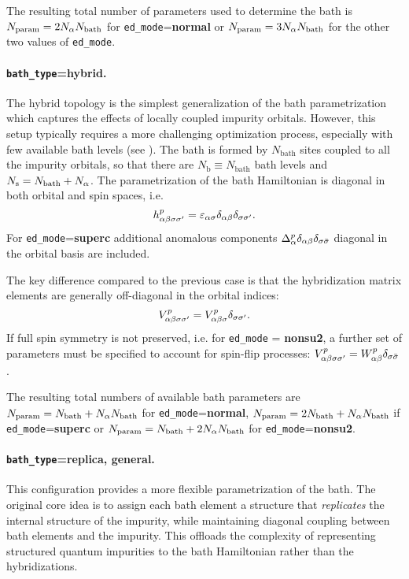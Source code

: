 \documentclass[edipack_sp.tex]{subfiles}
\begin{document}
The resulting total number of parameters used to determine the bath is $N_\mathrm{param}=2N_\alpha N_\mathrm{bath}$ for {\tt ed\_mode}={\bf normal} or $N_\mathrm{param}=3N_\alpha N_\mathrm{bath}$ for the other two values of {\tt ed\_mode}.


\paragraph{{\tt bath\_type}={\bf hybrid}.}
The hybrid topology is the simplest generalization of the bath pa\-ra\-me\-tri\-za\-tion which captures the effects of locally
coupled impurity orbitals. However, this setup typically requires a more challenging optimization process, especially
with few available bath levels (see ). 
The bath is formed by $N_\mathrm{bath}$ sites coupled to all the
impurity orbitals, so that there are $N_\mathrm{b}\equiv  N_\mathrm{bath}$ bath levels and   $N_\mathrm{s}=N_\mathrm{bath}+N_\alpha$. 
The parametrization of the bath Hamiltonian is 
diagonal in both orbital and spin spaces, i.e.
$$
h^p_{\alpha\beta\sigma\sigma'}=\varepsilon_{\alpha\sigma}\delta_{\alpha\beta}\delta_{\sigma\sigma'}.
$$
For {\tt ed\_mode}={\bf superc} additional anomalous components 
$\Delta_\alpha^p\delta_{\alpha\beta}\delta_{\sigma\bar{\sigma}}$ diagonal in the orbital basis are included.
%

The key difference compared to the previous case is that the hybridization matrix elements are generally off-diagonal in the orbital indices:
$$
V^p_{\alpha\beta\sigma\sigma'}=V^p_{\alpha\beta\sigma}\delta_{\sigma\sigma'}.
$$
%
If full spin symmetry is not preserved, i.e. for {\tt ed\_mode} = {\bf nonsu2}, a further 
set of parameters must be specified to account for spin-flip processes:
$V^p_{\alpha\beta\sigma\sigma'} = W^p_{\alpha\beta}\delta_{\sigma \bar{\sigma}}$. 
%

The resulting total numbers of available bath parameters are 
 $N_\mathrm{param}=N_\mathrm{bath}+ N_\alpha N_\mathrm{bath}$ for {\tt ed\_mode}={\bf normal},  
 $N_\mathrm{param}=2N_\mathrm{bath}+ N_\alpha N_\mathrm{bath}$ if  {\tt ed\_mode}={\bf superc} or 
$N_\mathrm{param}=N_\mathrm{bath}+ 2N_\alpha N_\mathrm{bath}$ for  {\tt ed\_mode}={\bf nonsu2}.



\paragraph{{\tt bath\_type}={\bf replica}, {\bf general}.}
This configuration provides a more flexible parametrization of the 
bath. The original core idea \cite{Capone2004PRB,Civelli2006,Koch2008PRB}
is to assign each bath element a structure 
that {\it replicates} the internal structure of the impurity, while 
maintaining diagonal coupling between bath elements and the impurity. 
This offloads the complexity of representing structured quantum 
impurities to the bath Hamiltonian rather than the hybridizations.
\end{document}
